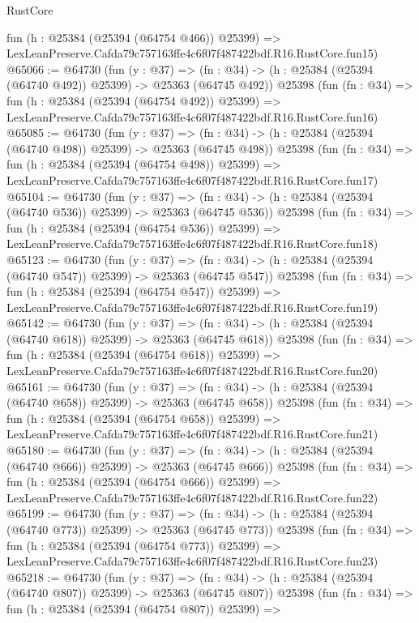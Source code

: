 \begin{lexlean}{RustCore}
\begin{coremodule}
    fun (h : @25384 (@25394 (@64754 @466)) @25399) =>
    LexLeanPreserve.Cafda79c757163ffe4c6f07f487422bdf.R16.RustCore.fun15)
@65066 := @64730
    (fun (y : @37) =>
    (fn : @34) -> (h : @25384 (@25394 (@64740 @492)) @25399) -> @25363 (@64745 @492))
    @25398
    (fun (fn : @34) =>
    fun (h : @25384 (@25394 (@64754 @492)) @25399) =>
    LexLeanPreserve.Cafda79c757163ffe4c6f07f487422bdf.R16.RustCore.fun16)
@65085 := @64730
    (fun (y : @37) =>
    (fn : @34) -> (h : @25384 (@25394 (@64740 @498)) @25399) -> @25363 (@64745 @498))
    @25398
    (fun (fn : @34) =>
    fun (h : @25384 (@25394 (@64754 @498)) @25399) =>
    LexLeanPreserve.Cafda79c757163ffe4c6f07f487422bdf.R16.RustCore.fun17)
@65104 := @64730
    (fun (y : @37) =>
    (fn : @34) -> (h : @25384 (@25394 (@64740 @536)) @25399) -> @25363 (@64745 @536))
    @25398
    (fun (fn : @34) =>
    fun (h : @25384 (@25394 (@64754 @536)) @25399) =>
    LexLeanPreserve.Cafda79c757163ffe4c6f07f487422bdf.R16.RustCore.fun18)
@65123 := @64730
    (fun (y : @37) =>
    (fn : @34) -> (h : @25384 (@25394 (@64740 @547)) @25399) -> @25363 (@64745 @547))
    @25398
    (fun (fn : @34) =>
    fun (h : @25384 (@25394 (@64754 @547)) @25399) =>
    LexLeanPreserve.Cafda79c757163ffe4c6f07f487422bdf.R16.RustCore.fun19)
@65142 := @64730
    (fun (y : @37) =>
    (fn : @34) -> (h : @25384 (@25394 (@64740 @618)) @25399) -> @25363 (@64745 @618))
    @25398
    (fun (fn : @34) =>
    fun (h : @25384 (@25394 (@64754 @618)) @25399) =>
    LexLeanPreserve.Cafda79c757163ffe4c6f07f487422bdf.R16.RustCore.fun20)
@65161 := @64730
    (fun (y : @37) =>
    (fn : @34) -> (h : @25384 (@25394 (@64740 @658)) @25399) -> @25363 (@64745 @658))
    @25398
    (fun (fn : @34) =>
    fun (h : @25384 (@25394 (@64754 @658)) @25399) =>
    LexLeanPreserve.Cafda79c757163ffe4c6f07f487422bdf.R16.RustCore.fun21)
@65180 := @64730
    (fun (y : @37) =>
    (fn : @34) -> (h : @25384 (@25394 (@64740 @666)) @25399) -> @25363 (@64745 @666))
    @25398
    (fun (fn : @34) =>
    fun (h : @25384 (@25394 (@64754 @666)) @25399) =>
    LexLeanPreserve.Cafda79c757163ffe4c6f07f487422bdf.R16.RustCore.fun22)
@65199 := @64730
    (fun (y : @37) =>
    (fn : @34) -> (h : @25384 (@25394 (@64740 @773)) @25399) -> @25363 (@64745 @773))
    @25398
    (fun (fn : @34) =>
    fun (h : @25384 (@25394 (@64754 @773)) @25399) =>
    LexLeanPreserve.Cafda79c757163ffe4c6f07f487422bdf.R16.RustCore.fun23)
@65218 := @64730
    (fun (y : @37) =>
    (fn : @34) -> (h : @25384 (@25394 (@64740 @807)) @25399) -> @25363 (@64745 @807))
    @25398
    (fun (fn : @34) =>
    fun (h : @25384 (@25394 (@64754 @807)) @25399) =>

\end{coremodule}
\end{lexlean}
